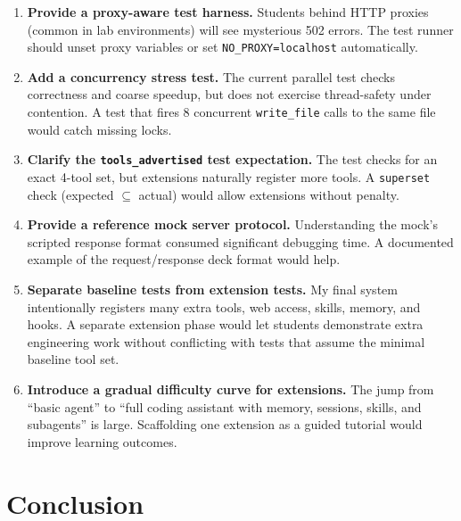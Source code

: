 \documentclass[11pt,a4paper]{article}
\begin{document}
\begin{enumerate}[leftmargin=2em]
  \item \textbf{Provide a proxy-aware test harness.} Students behind HTTP
        proxies (common in lab environments) will see mysterious 502 errors.
        The test runner should unset proxy variables or set
        \texttt{NO\_PROXY=localhost} automatically.

  \item \textbf{Add a concurrency stress test.} The current parallel test
        checks correctness and coarse speedup, but does not exercise
        thread-safety under contention. A test that fires 8 concurrent
        \texttt{write\_file} calls to the same file would catch missing locks.

  \item \textbf{Clarify the \texttt{tools\_advertised} test expectation.}
        The test checks for an exact 4-tool set, but extensions naturally
        register more tools. A \texttt{superset} check (expected
        $\subseteq$ actual) would allow extensions without penalty.

  \item \textbf{Provide a reference mock server protocol.} Understanding the
        mock's scripted response format consumed significant debugging time.
        A documented example of the request/response deck format would help.

  \item \textbf{Separate baseline tests from extension tests.} My final system
        intentionally registers many extra tools, web access, skills, memory,
        and hooks. A separate extension phase would let students demonstrate
        extra engineering work without conflicting with tests that assume the
        minimal baseline tool set.

  \item \textbf{Introduce a gradual difficulty curve for extensions.} The jump
        from ``basic agent'' to ``full coding assistant with memory, sessions,
        skills, and subagents'' is large. Scaffolding one extension as a
        guided tutorial would improve learning outcomes.
\end{enumerate}


\section{Conclusion}
\end{document}
